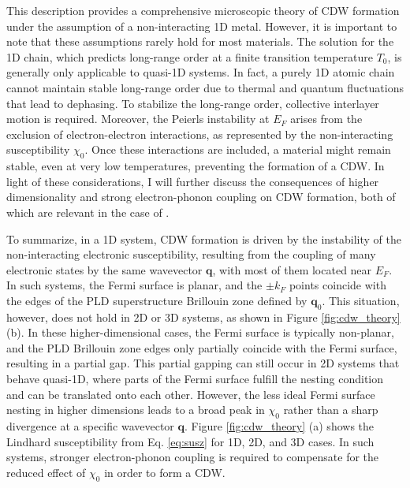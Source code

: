 This description provides a comprehensive microscopic theory of CDW formation under the assumption of a non-interacting 1D metal.
However, it is important to note that these assumptions rarely hold for most materials.
The solution for the 1D chain, which predicts long-range order at a finite transition temperature $T_0$, is generally only applicable to quasi-1D systems.
In fact, a purely 1D atomic chain cannot maintain stable long-range order due to thermal and quantum fluctuations that lead to dephasing.
To stabilize the long-range order, collective interlayer motion is required.
Moreover, the Peierls instability at $E_F$ arises from the exclusion of electron-electron interactions, as represented by the non-interacting susceptibility $\chi_0$.
Once these interactions are included, a material might remain stable, even at very low temperatures, preventing the formation of a CDW.
In light of these considerations, I will further discuss the consequences of higher dimensionality and strong electron-phonon coupling on CDW formation, both of which are relevant in the case of .

To summarize, in a 1D system, CDW formation is driven by the instability of the non-interacting electronic susceptibility, resulting from the coupling of many electronic states by the same wavevector $\mathbf{q}$, with most of them located near $E_F$.
In such systems, the Fermi surface is planar, and the $\pm k_F$ points coincide with the edges of the PLD superstructure Brillouin zone defined by $\mathbf{q}_0$.
This situation, however, does not hold in 2D or 3D systems, as shown in Figure \ref{fig:cdw_theory} (b).
In these higher-dimensional cases, the Fermi surface is typically non-planar, and the PLD Brillouin zone edges only partially coincide with the Fermi surface, resulting in a partial gap.
This partial gapping can still occur in 2D systems that behave quasi-1D, where parts of the Fermi surface fulfill the nesting condition and can be translated onto each other.
However, the less ideal Fermi surface nesting in higher dimensions leads to a broad peak in $\chi_0$ rather than a sharp divergence at a specific wavevector $\mathbf{q}$.
Figure \ref{fig:cdw_theory} (a) shows the Lindhard susceptibility from Eq. \ref{eq:susz} for 1D, 2D, and 3D cases.
In such systems, stronger electron-phonon coupling is required to compensate for the reduced effect of $\chi_0$ in order to form a CDW.

